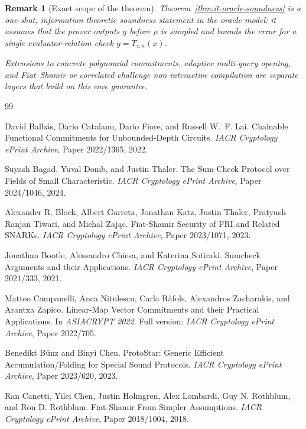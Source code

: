 \documentclass[11pt]{article}
\newtheorem{remark}[theorem]{Remark}
\begin{document}
\begin{remark}[Exact scope of the theorem]
\label{rem:it-scope}
Theorem~\ref{thm:it-oracle-soundness} is a \emph{one-shot}, information-theoretic soundness statement in the oracle model: it assumes that the prover outputs $y$ before $\rho$ is sampled and bounds the error for a single evaluator-relation check $y=T_{\tau,n}(x)$.

Extensions to concrete polynomial commitments, adaptive multi-query opening, and Fiat--Shamir or correlated-challenge non-interactive compilation are separate layers that build on this core guarantee.
\end{remark}

\begin{thebibliography}{99}

David Balb\'as, Dario Catalano, Dario Fiore, and Russell W.~F. Lai.
\newblock Chainable Functional Commitments for Unbounded-Depth Circuits.
\newblock \emph{IACR Cryptology ePrint Archive}, Paper 2022/1365, 2022.

Suyash Bagad, Yuval Domb, and Justin Thaler.
\newblock The Sum-Check Protocol over Fields of Small Characteristic.
\newblock \emph{IACR Cryptology ePrint Archive}, Paper 2024/1046, 2024.

Alexander R. Block, Albert Garreta, Jonathan Katz, Justin Thaler, Pratyush Ranjan Tiwari, and Micha\l{} Zaj\k{a}c.
\newblock Fiat-Shamir Security of {FRI} and Related {SNARKs}.
\newblock \emph{IACR Cryptology ePrint Archive}, Paper 2023/1071, 2023.

Jonathan Bootle, Alessandro Chiesa, and Katerina Sotiraki.
\newblock Sumcheck Arguments and their Applications.
\newblock \emph{IACR Cryptology ePrint Archive}, Paper 2021/333, 2021.

Matteo Campanelli, Anca Nitulescu, Carla R\`afols, Alexandros Zacharakis, and Arantxa Zapico.
\newblock Linear-Map Vector Commitments and their Practical Applications.
\newblock In \emph{ASIACRYPT 2022}. Full version: \emph{IACR Cryptology ePrint Archive}, Paper 2022/705.

Benedikt B\"unz and Binyi Chen.
\newblock ProtoStar: Generic Efficient Accumulation/Folding for Special Sound Protocols.
\newblock \emph{IACR Cryptology ePrint Archive}, Paper 2023/620, 2023.

Ran Canetti, Yilei Chen, Justin Holmgren, Alex Lombardi, Guy N. Rothblum, and Ron D. Rothblum.
\newblock Fiat-Shamir From Simpler Assumptions.
\newblock \emph{IACR Cryptology ePrint Archive}, Paper 2018/1004, 2018.


\end{thebibliography}
\end{document}
